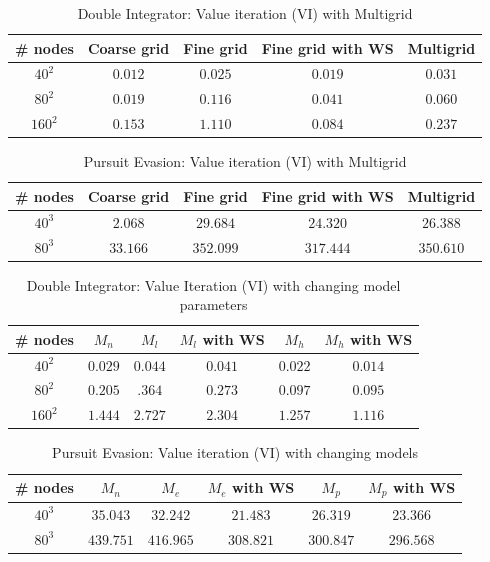 \begin{table}
\centering
\caption{Double Integrator: Value iteration (VI) with Multigrid}
\begin{tabular}{|c| c| c| c| c| }
\hline
\# nodes & Coarse grid & Fine grid &  Fine grid with WS & Multigrid \\ \hline
$40^2$ & $0.012$ & $0.025$ & $0.019$ & $0.031$ \\ \hline
$80^2$ & $0.019$ & $0.116$ & $0.041$ & $0.060$\\ \hline
$160^2$ & $0.153$ & $1.110$ & $0.084$ & $0.237$\\ \hline
\end{tabular}
\end{table}

\begin{table}
\centering
\caption{Pursuit Evasion: Value iteration (VI) with Multigrid}
\begin{tabular}{|c| c| c| c| c| }
\hline
\# nodes & Coarse grid & Fine grid &  Fine grid with WS & Multigrid \\ \hline
$40^3$ & $2.068$ & $29.684$ & $24.320$ & $26.388$ \\ \hline
$80^3$ & $33.166$ & $352.099$ & $317.444$ & $350.610$\\ \hline
\end{tabular}
\end{table}

\begin{table}
\centering
\caption{Double Integrator: Value Iteration (VI) with changing model parameters}
\begin{tabular}{|c| c| c| c| c| c|}
\hline
\# nodes & $M_n$ & $M_l$ &  $M_l$ with WS & $M_h$ & $M_h$ with WS \\ \hline
$40^2$ & $0.029$ & $0.044$ & $0.041$ & $0.022$ & $0.014$\\ \hline
$80^2$ & $0.205$ & $.364$ & $0.273$ & $0.097$ & $0.095$\\ \hline
$160^2$ & $1.444$ & $2.727$ & $2.304$ & $1.257$ & $1.116$\\ \hline
\end{tabular}
\end{table}

\begin{table}
\centering
\caption{Pursuit Evasion: Value iteration (VI) with changing models}
\begin{tabular}{|c| c| c| c| c| c|}
\hline
\# nodes & $M_n$ & $M_e$ &  $M_e$ with WS & $M_p$ & $M_p$ with WS \\ \hline
$40^3$ & $35.043$ & $32.242$ & $21.483$ & $26.319$ & $23.366$ \\ \hline
$80^3$ & $439.751$ & $416.965$ & $308.821$ & $300.847$ & $296.568$\\ \hline
\end{tabular}
\end{table}


